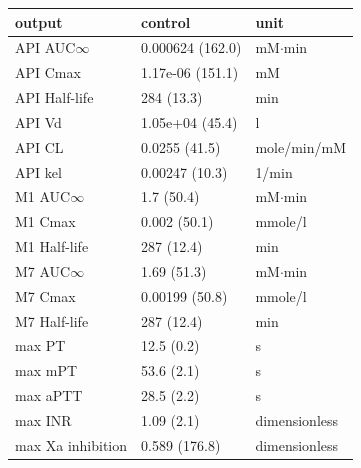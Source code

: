 \begin{tabular}{lll}
\toprule
output & control & unit \\
\midrule
API AUC$\infty$ & 0.000624 (162.0) & mM$\cdot$min \\
API Cmax & 1.17e-06 (151.1) & mM \\
API Half-life & 284 (13.3) & min \\
API Vd & 1.05e+04 (45.4) & l \\
API CL & 0.0255 (41.5) & mole/min/mM \\
API kel & 0.00247 (10.3) & 1/min \\
M1 AUC$\infty$ & 1.7 (50.4) & mM$\cdot$min \\
M1 Cmax & 0.002 (50.1) & mmole/l \\
M1 Half-life & 287 (12.4) & min \\
M7 AUC$\infty$ & 1.69 (51.3) & mM$\cdot$min \\
M7 Cmax & 0.00199 (50.8) & mmole/l \\
M7 Half-life & 287 (12.4) & min \\
max PT & 12.5 (0.2) & s \\
max mPT & 53.6 (2.1) & s \\
max aPTT & 28.5 (2.2) & s \\
max INR & 1.09 (2.1) & dimensionless \\
max Xa inhibition & 0.589 (176.8) & dimensionless \\
\bottomrule
\end{tabular}
